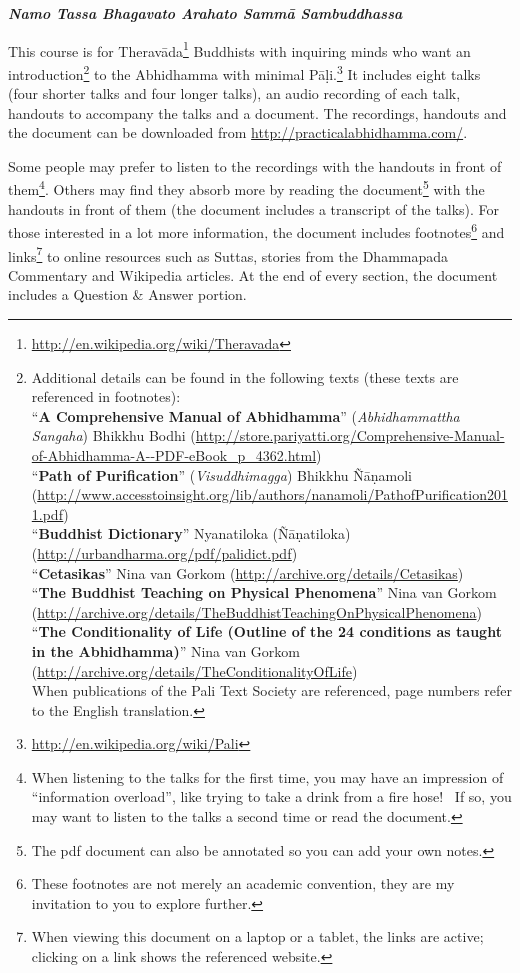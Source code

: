 \begin{center}
\textbf{\textit{Namo Tassa Bhagavato Arahato Sammā Sambuddhassa}} \\
\end{center}

\vspace{10mm}

This course is for Theravāda\footnote{\url{http://en.wikipedia.org/wiki/Theravada}} Buddhists with inquiring minds who want an introduction\footnote{Additional details can be found in the following texts (these texts are referenced in footnotes):\\
“\textbf{A Comprehensive Manual of Abhidhamma}” (\textit{Abhidhammattha Sangaha}) Bhikkhu Bodhi (\url{http://store.pariyatti.org/Comprehensive-Manual-of-Abhidhamma-A--PDF-eBook_p_4362.html})\\
“\textbf{Path of Purification}” (\textit{Visuddhimagga}) Bhikkhu Ñāṇamoli (\url{http://www.accesstoinsight.org/lib/authors/nanamoli/PathofPurification2011.pdf})\\
“\textbf{Buddhist Dictionary}” Nyanatiloka (Ñāṇatiloka) (\url{http://urbandharma.org/pdf/palidict.pdf})\\
“\textbf{Cetasikas}” Nina van Gorkom (\url{http://archive.org/details/Cetasikas})\\
“\textbf{The Buddhist Teaching on Physical Phenomena}” Nina van Gorkom (\url{http://archive.org/details/TheBuddhistTeachingOnPhysicalPhenomena})\\
“\textbf{The Conditionality of Life (Outline of the 24 conditions as taught in the Abhidhamma)}” Nina van Gorkom (\url{http://archive.org/details/TheConditionalityOfLife})\\
When publications of the Pali Text Society are referenced, page numbers refer to the English translation.} to the Abhidhamma with minimal Pāḷi.\footnote{\url{http://en.wikipedia.org/wiki/Pali}} It includes eight talks (four shorter talks and four longer talks), an audio recording of each talk, handouts to accompany the talks and a document. The recordings, handouts and the document can be downloaded from \url{http://practicalabhidhamma.com/}.

Some people may prefer to listen to the recordings with the handouts in front of them\footnote{When listening to the talks for the first time, you may have an impression of “information overload”, like trying to take a drink from a fire hose! \smiley \  If so, you may want to listen to the talks a second time or read the document.}. Others may find they absorb more by reading the document\footnote{The pdf document can also be annotated so you can add your own notes.} with the handouts in front of them (the document includes a transcript of the talks). For those interested in a lot more information, the document includes footnotes\footnote{These footnotes are not merely an academic convention, they are my invitation to you to explore further.} and links\footnote{When viewing this document on a laptop or a tablet, the links are active; clicking on a link shows the referenced website.} to online resources such as Suttas, stories from the Dhammapada Commentary and Wikipedia articles. At the end of every section, the document includes a Question \& Answer portion. 

